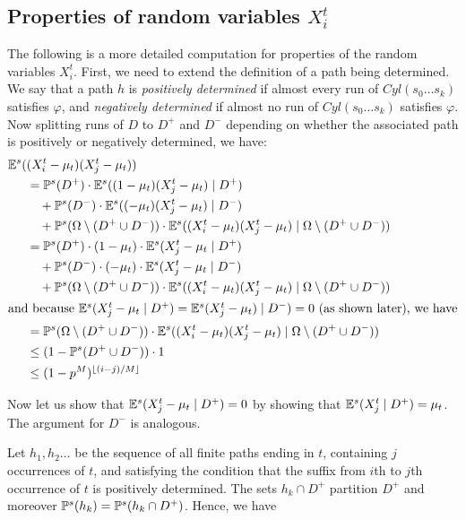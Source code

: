 \documentclass[a4paper,UKenglish]{lipics}
\newcommand{\cyl}{\mathit{Cyl}}
\newcommand{\E}[2][]{\ifblank{#1}{\mathbb{E}(#2)}{\mathbb{E}^{#1}(#2)}}
\renewcommand{\P}[2][]{\ifblank{#1}{\mathbb{P}(#2)}{\mathbb{P}^{#1}(#2)}}
\begin{document}
\subsection{Properties of random variables $X^t_i$}
\label{app:rv-xti}
The following is a more detailed computation for properties of the random variables $X^t_i$. First, we need to extend the definition of a path being determined. We say that a path $h$ is {\em positively determined} if almost every run of $\cyl(s_0\ldots s_k)$ satisfies $\varphi$, and {\em negatively determined} if almost no run of $\cyl(s_0\ldots s_k)$ satisfies $\varphi$. Now splitting runs of $D$ to $D^+$ and $D^-$ depending on whether the associated path
is positively or negatively determined, we have:
\begin{align*}
 \E[s]{&(X^t_i - \mu_t) (X^t_j - \mu_t)} \\
& = \P[s]{D^+}\cdot \E[s]{(1-\mu_t) (X^t_j - \mu_t) \mid D^+} \\
& \quad + \P[s]{D^-} \cdot \E[s]{(-\mu_t) (X^t_j - \mu_t) \mid D^-}\\
& \quad + \P[s]{\Omega\setminus(D^+\cup D^-)}\cdot\E[s]{(X^t_i - \mu_t) (X^t_j - \mu_t) \mid \Omega\setminus(D^+\cup D^-)}\\ 
& = \P[s]{D^+}\cdot (1-\mu_t)\cdot \E[s]{X^t_j - \mu_t \mid D^+}\\
& \quad+ \P[s]{D^-} \cdot (-\mu_t)\cdot \E[s]{X^t_j - \mu_t \mid D^-} \\
& \quad + \P[s]{\Omega\setminus(D^+\cup D^-)}\cdot\E[s]{(X^t_i - \mu_t) (X^t_j - \mu_t) \mid \Omega\setminus(D^+\cup D^-)}\\ 
\intertext{and because $\E[s]{X^t_j - \mu_t \mid D^+} = \E[s]{X^t_j - \mu_t) \mid D^-} = 0$ (as shown later), we have}
& = \P[s]{\Omega\setminus(D^+\cup D^-)}\cdot\E[s]{(X^t_i - \mu_t) (X^t_j - \mu_t) \mid \Omega\setminus(D^+\cup D^-)}\\ 
& \le (1-\P[s]{D^+\cup D^-}) \cdot 1\\ 
& \le (1-p^M)^{\lfloor (i-j)/M\rfloor}
\end{align*}

Now let us show that $\E[s]{X^t_j - \mu_t \mid D^+} = 0$ by showing that $\E[s]{X^t_j\mid D^+}=\mu_t$. The argument for $D^-$ is analogous.

Let $h_1,h_2\ldots$ be the sequence of all finite paths ending in $t$, containing $j$ occurrences of $t$, and satisfying the condition that
the suffix from $i$th to $j$th occurrence of $t$ is positively determined. The sets $h_k\cap D^+$ partition $D^+$ and moreover
$\P[s]{h_k} = \P[s]{h_k\cap D^+}$. Hence, we have
\end{document}
